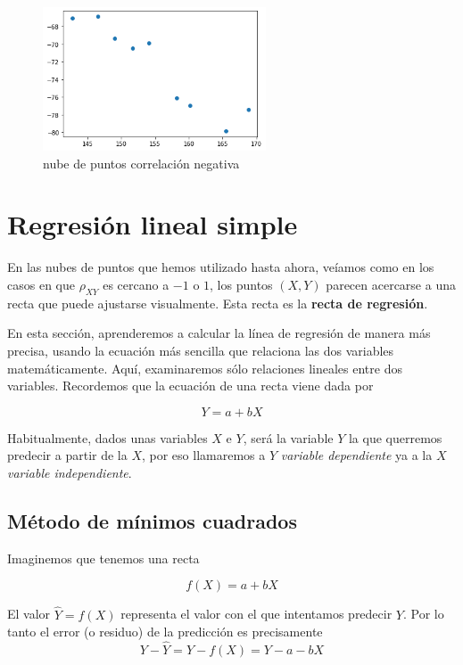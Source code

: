 \documentclass[
]{article}
\begin{document}
\begin{itemize}
  \begin{figure}
  \centering
  \includegraphics[width=2.60417in,height=\textheight]{cloud_menos.png}
  \caption{nube de puntos correlación negativa}
  \end{figure}
\end{itemize}

\hypertarget{regresiuxf3n-lineal-simple}{%
\section{Regresión lineal simple}\label{regresiuxf3n-lineal-simple}}

En las nubes de puntos que hemos utilizado hasta ahora, veíamos como en
los casos en que \(\rho_{XY}\) es cercano a \(-1\) o \(1\), los puntos
\((X,Y)\) parecen acercarse a una recta que puede ajustarse visualmente.
Esta recta es la \textbf{recta de regresión}.

En esta sección, aprenderemos a calcular la línea de regresión de manera
más precisa, usando la ecuación más sencilla que relaciona las dos
variables matemáticamente. Aquí, examinaremos sólo relaciones lineales
entre dos variables. Recordemos que la ecuación de una recta viene dada
por

\[Y= a + b X \]

Habitualmente, dados unas variables \(X\) e \(Y\), será la variable
\(Y\) la que querremos predecir a partir de la \(X\), por eso llamaremos
a \(Y\) \emph{variable dependiente} ya a la \(X\) \emph{variable
independiente}.

\hypertarget{muxe9todo-de-muxednimos-cuadrados}{%
\subsection{Método de mínimos
cuadrados}\label{muxe9todo-de-muxednimos-cuadrados}}

Imaginemos que tenemos una recta

\[f(X)= a + b X\]

El valor \(\hat Y = f(X)\) representa el valor con el que intentamos
predecir \(Y\). Por lo tanto el error (o residuo) de la predicción es
precisamente \[Y- \hat Y = Y - f(X) = Y- a - b X\]
\end{document}
